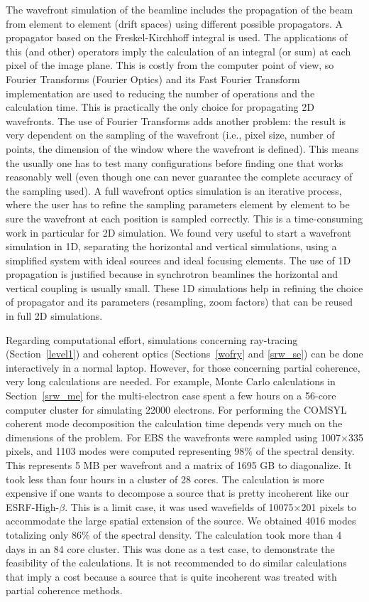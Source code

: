 \documentclass{iucr}              %
\newcommand{\inred}[1]{{\color{red}#1}}
\begin{document}
The wavefront simulation of the beamline includes the propagation of the beam from element to element (drift spaces) using different possible propagators. A propagator based on the Freskel-Kirchhoff integral is used. The applications of this (and other) operators imply the calculation of an integral (or sum) at each pixel of the image plane. This is costly from the computer point of view, so Fourier Transforms (Fourier Optics) and its Fast Fourier Transform implementation are used to reducing the number of operations and the calculation time. This is practically the only choice for propagating 2D wavefronts. The use of Fourier Transforms adds another problem: the result is very dependent on the sampling of the wavefront (i.e., pixel size, number of points, the dimension of the window where the wavefront is defined). This means the usually one has to test many configurations before finding one that works reasonably well (even though one can never guarantee the complete accuracy of the sampling used). A full wavefront optics simulation is an iterative process, where the user has to refine the sampling parameters element by element to be sure the wavefront at each position is sampled correctly. This is a time-consuming work in particular for 2D simulation. We found very useful to start a wavefront simulation in 1D, separating the horizontal and vertical simulations, using a simplified system with ideal sources and ideal focusing elements. The use of 1D propagation is justified because in synchrotron beamlines the horizontal and vertical coupling is usually small. These 1D simulations help in refining the choice of propagator and its parameters (resampling, zoom factors) that can be reused in full 2D simulations.

Regarding computational effort, simulations concerning ray-tracing (Section~\ref{level1}) and coherent optics (Sections~\ref{wofry} and \ref{srw_se}) can be done interactively in a normal laptop. However, for those concerning partial coherence, very long calculations are needed. For example, Monte Carlo calculations in Section~\ref{srw_me} for the multi-electron case spent a few hours on a 56-core computer cluster for simulating 22000 electrons. For performing the COMSYL coherent mode decomposition the calculation time depends very much on the dimensions of the problem. For EBS the wavefronts were sampled using 1007$\times$335 pixels, and 1103 modes were computed representing 98\% of the spectral density. This represents 5 MB per wavefront and a matrix of 1695 GB to diagonalize. It took less than four hours in a cluster of 28 cores. The calculation is more expensive if one wants to decompose a source that is pretty incoherent like our ESRF-High-$\beta$. This is a limit case, it was used wavefields of 10075$\times$201 pixels to accommodate the large spatial extension of the source. We obtained 4016 modes totalizing only 86\% of the spectral density.  The calculation took more than 4 days in an 84 core cluster. This was done as a test case, to demonstrate the feasibility of the calculations. It is not recommended to do similar calculations that imply a cost because a source that is quite incoherent was treated with partial coherence methods. 
\end{document}
